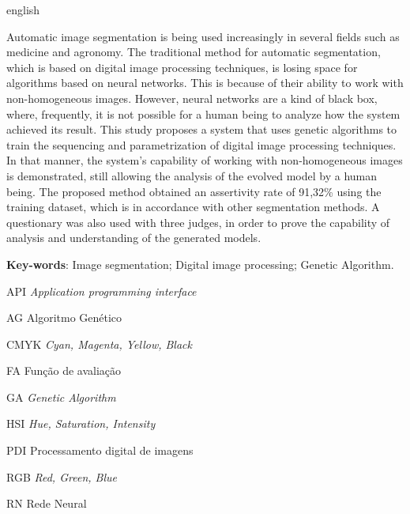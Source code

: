 \documentclass[12pt,oneside,a4paper,english,french,spanish,brazil,]{abntex2}
\begin{document}
\begin{resumo}[Abstract]
 \begin{otherlanguage*}{english}

Automatic image segmentation is being used increasingly in several fields such as medicine and agronomy. The traditional method for automatic segmentation, which is based on digital image processing techniques, is losing space for algorithms based on neural networks. This is because of their ability to work with non-homogeneous images. However, neural networks are a kind of black box, where, frequently, it is not possible for a human being to analyze how the system achieved its result. This study proposes a system that uses genetic algorithms to train the sequencing and parametrization of digital image processing techniques. In that manner, the system's capability of working with non-homogeneous images is demonstrated, still allowing the analysis of the evolved model by a human being. The proposed method obtained an assertivity rate of 91,32\% using the training dataset, which is in accordance with other segmentation methods. A questionary was also used with three judges, in order to prove the capability of analysis and understanding of the generated models.

   \vspace{\onelineskip}
 
   \noindent 
   \textbf{Key-words}: Image segmentation; Digital image processing; Genetic Algorithm.
 \end{otherlanguage*}
\end{resumo}

\listoffigures*
\cleardoublepage
{}
\listoftables*
\cleardoublepage
\begin{siglas}
  \item[API] \textit{Application programming interface}
  \item[AG] Algoritmo Genético
  \item[CMYK] \textit{Cyan, Magenta, Yellow, Black}
  \item[FA] Função de avaliação
  \item[GA] \textit{Genetic Algorithm}
  \item[HSI] \textit{Hue, Saturation, Intensity}
  \item[PDI] Processamento digital de imagens
  \item[RGB] \textit{Red, Green, Blue}
  \item[RN] Rede Neural
\end{siglas}
\tableofcontents*
\cleardoublepage
\textual
\end{document}
